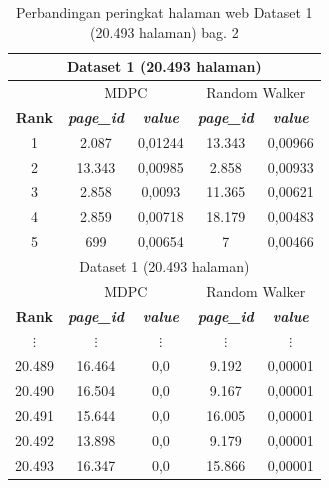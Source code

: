 \begin{longtable}{|c|c|c|c|c|}
	\caption{Perbandingan peringkat halaman web Dataset 1 (20.493 halaman) bag. 2}
	\label{table:rank_comparisson_dataset_1} \\
	\hline
	\multicolumn{5}{|c|}{Dataset 1 (20.493 halaman)} \\
	\hline
	& \multicolumn{2}{c|}{MDPC} & \multicolumn{2}{c|}{Random Walker} \\
	\hline
	\textbf{Rank} & \textbf{\textit{page\_id}} & \textbf{\textit{value}} & \textbf{\textit{page\_id}} & \textbf{\textit{value}} \\
	\hline
	1 & 2.087 & 0,01244 & 13.343 & 0,00966 \\
	2 & 13.343 & 0,00985 & 2.858 & 0,00933 \\
	3 & 2.858 & 0,0093 & 11.365 & 0,00621 \\
	4 & 2.859 & 0,00718 & 18.179 & 0,00483 \\
	5 & 699 & 0,00654 & 7 & 0,00466 \\
	\hline
	\hline
	\multicolumn{5}{|c|}{Dataset 1 (20.493 halaman)} \\
	\hline
	& \multicolumn{2}{c|}{MDPC} & \multicolumn{2}{c|}{Random Walker} \\
	\hline
	\textbf{Rank} & \textbf{\textit{page\_id}} & \textbf{\textit{value}} & \textbf{\textit{page\_id}} & \textbf{\textit{value}} \\
	\hline
	$\vdots$ & $\vdots$ & $\vdots$ & $\vdots$ & $\vdots$ \\
	20.489 & 16.464 & 0,0 & 9.192 & 0,00001 \\
	20.490 & 16.504 & 0,0 & 9.167 & 0,00001 \\
	20.491 & 15.644 & 0,0 & 16.005 & 0,00001 \\
	20.492 & 13.898 & 0,0 & 9.179 & 0,00001 \\
	20.493 & 16.347 & 0,0 & 15.866 & 0,00001 \\
	\hline
\end{longtable}

